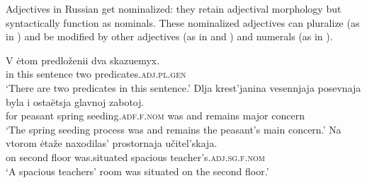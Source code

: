 \documentclass[output=paper,
colorlinks,
citecolor=brown,
newtxmath
]{langscibook}
\begin{document}

\ea\label{krasnyetufli} 
\z\z


\ea\label{molodyjeljudi}
\z\z

\noindent Adjectives in Russian get nominalized: they retain adjectival morphology but syntactically function as nominals. These nominalized adjectives can pluralize (as in ) and be modified by other adjectives (as in  and ) and numerals (as in ).


\ea\label{38_a}
    \ea \gll V ėtom predloženii dva skazuemyx.\\
    in this sentence two predicates.\textsc{adj.pl.gen}\\
    \glt `There are two predicates in this sentence.'
    \ex\label{38_b} \gll Dlja krest'janina vesennjaja posevnaja byla i ostaëtsja glavnoj zabotoj.\\
    for peasant spring seeding.\textsc{adf.f.nom} was and remains major concern\\
    \glt `The spring seeding process was and remains the peasant's main concern.'
    \ex\label{38_c} \gll Na vtorom ėtaže naxodilas' prostornaja učitel'skaja.\\
    on second floor {was.situated} spacious teacher's.\textsc{adj.sg.f.nom}\\
    \glt `A spacious teachers' room was situated on the second floor.'
\z\z 
\end{document}
